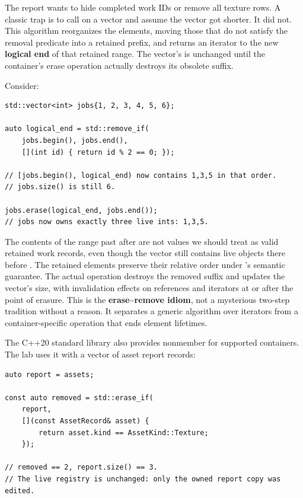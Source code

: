 The report wants to hide completed work IDs or remove all texture rows. A classic trap is to call  on a vector and assume the vector got shorter. It did not. This algorithm reorganizes the elements, moving those that do not satisfy the removal predicate into a retained prefix, and returns an iterator to the new \textbf{logical end} of that retained range. The vector's  is unchanged until the container's erase operation actually destroys its obsolete suffix.

Consider:

\begin{verbatim}
std::vector<int> jobs{1, 2, 3, 4, 5, 6};

auto logical_end = std::remove_if(
    jobs.begin(), jobs.end(),
    [](int id) { return id % 2 == 0; });

// [jobs.begin(), logical_end) now contains 1,3,5 in that order.
// jobs.size() is still 6.

jobs.erase(logical_end, jobs.end());
// jobs now owns exactly three live ints: 1,3,5.
\end{verbatim}

The contents of the range past  after  are not values we should treat as valid retained work records, even though the vector still contains live objects there before . The retained elements preserve their relative order under 's semantic guarantee. The actual  operation destroys the removed suffix and updates the vector's size, with invalidation effects on references and iterators at or after the point of erasure. This is the \textbf{erase--remove idiom}, not a mysterious two-step tradition without a reason. It separates a generic algorithm over iterators from a container-specific operation that ends element lifetimes.

The C++20 standard library also provides nonmember  for supported containers. The lab uses it with a vector of asset report records:

\begin{verbatim}
auto report = assets;

const auto removed = std::erase_if(
    report,
    [](const AssetRecord& asset) {
        return asset.kind == AssetKind::Texture;
    });

// removed == 2, report.size() == 3.
// The live registry is unchanged: only the owned report copy was edited.
\end{verbatim}

